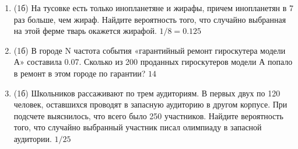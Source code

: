 \documentclass[a4paper, 12pt]{article}
\begin{document}
\begin{enumerate}
\item (1б) На тусовке есть только инопланетяне и жирафы, причем инопланетян в 7 раз больше, чем жираф. Найдите вероятность того, 
что случайно выбранная на этой ферме тварь окажется жирафой.
$1/8=0.125$

\item (1б) В городе N частота события «гарантийный ремонт гироскутера модели А» составила 0.07. 
Сколько из 200 проданных гироскутеров модели А попало в ремонт в этом городе по гарантии?
$14$

\item (1б) Школьников рассаживают по трем аудиториям. В первых двух по 120 человек, оставшихся проводят в запасную аудиторию в другом корпусе. 
При подсчете выяснилось, что всего было 250 участников. Найдите вероятность того, что случайно выбранный участник писал олимпиаду в запасной аудитории.
$1/25$

        


\end{enumerate}
\end{document}
